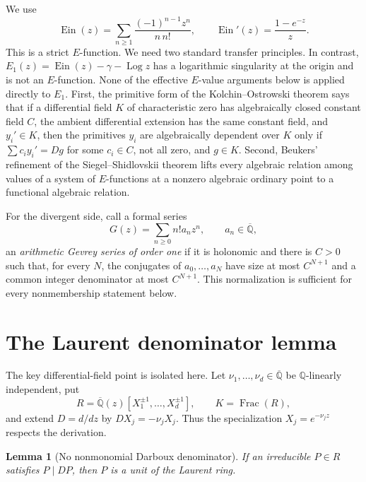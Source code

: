 \documentclass[11pt]{article}
\newtheorem{lemma}[theorem]{Lemma}
\theoremstyle{definition}
\theoremstyle{remark}
\newcommand{\Q}{\mathbb Q}
\newcommand{\Qb}{\overline{\mathbb Q}}
\newcommand{\Ein}{\operatorname{Ein}}
\newcommand{\Log}{\operatorname{Log}}
\begin{document}
We use
\[
 \Ein(z)=\sum_{n\ge1}\frac{(-1)^{n-1}z^n}{n\,n!},
 \qquad
 \Ein'(z)=\frac{1-e^{-z}}{z}.
\]
This is a strict \(E\)-function.  We need two standard transfer principles.
In contrast, \(E_1(z)=\Ein(z)-\gamma-\Log z\) has a logarithmic
singularity at the origin and is not an \(E\)-function.  None of the
effective \(E\)-value arguments below is applied directly to \(E_1\).
First, the primitive form of the Kolchin--Ostrowski theorem \cite{Kolchin}
says that if a
differential field \(K\) of characteristic zero has algebraically closed
constant field \(C\), the ambient differential extension has the same
constant field, and \(y_i'\in K\), then the primitives \(y_i\) are
algebraically dependent over \(K\) only if
\(\sum c_i y_i'=Dg\) for some \(c_i\in C\), not all zero, and \(g\in K\).
Second, Beukers' refinement of the Siegel--Shidlovskii theorem
\cite{Beukers2006} lifts every
algebraic relation among values of a system of \(E\)-functions at a nonzero
algebraic ordinary point to a functional algebraic relation.

For the divergent side, call a formal series
\[
 G(z)=\sum_{n\ge0}n!a_nz^n,\qquad a_n\in\Qb,
\]
an \emph{arithmetic Gevrey series of order one} if it is holonomic and there
is \(C>0\) such that, for every \(N\), the conjugates of
\(a_0,\ldots,a_N\) have size at most \(C^{N+1}\) and a common integer
denominator at most \(C^{N+1}\).  This normalization is sufficient for every
nonmembership statement below.

\section{The Laurent denominator lemma}

The key differential-field point is isolated here.  Let
\(\nu_1,\ldots,\nu_d\in\Qb\) be \(\Q\)-linearly independent, put
\[
 R=\Qb(z)[X_1^{\pm1},\ldots,X_d^{\pm1}],\qquad K=\operatorname{Frac}(R),
\]
and extend \(D=d/dz\) by \(DX_j=-\nu_jX_j\).  Thus the specialization
\(X_j=e^{-\nu_jz}\) respects the derivation.

\begin{lemma}[No nonmonomial Darboux denominator]\label{lem:darboux}
If an irreducible \(P\in R\) satisfies \(P\mid DP\), then \(P\) is a unit
of the Laurent ring.
\end{lemma}
\end{document}
